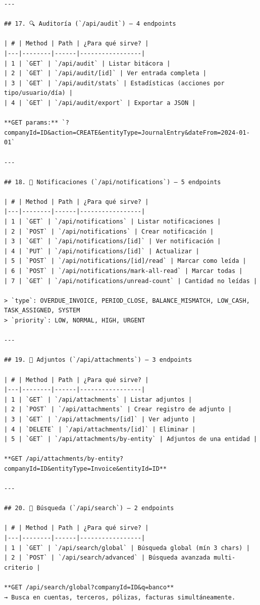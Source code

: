 \documentclass[12pt, a4paper, oneside]{book}
\begin{document}
\begin{lstlisting}
---

## 17. 🔍 Auditoría (`/api/audit`) — 4 endpoints

| # | Method | Path | ¿Para qué sirve? |
|---|--------|------|-----------------|
| 1 | `GET` | `/api/audit` | Listar bitácora |
| 2 | `GET` | `/api/audit/[id]` | Ver entrada completa |
| 3 | `GET` | `/api/audit/stats` | Estadísticas (acciones por tipo/usuario/día) |
| 4 | `GET` | `/api/audit/export` | Exportar a JSON |

**GET params:** `?companyId=ID&action=CREATE&entityType=JournalEntry&dateFrom=2024-01-01`

---

## 18. 🔔 Notificaciones (`/api/notifications`) — 5 endpoints

| # | Method | Path | ¿Para qué sirve? |
|---|--------|------|-----------------|
| 1 | `GET` | `/api/notifications` | Listar notificaciones |
| 2 | `POST` | `/api/notifications` | Crear notificación |
| 3 | `GET` | `/api/notifications/[id]` | Ver notificación |
| 4 | `PUT` | `/api/notifications/[id]` | Actualizar |
| 5 | `POST` | `/api/notifications/[id]/read` | Marcar como leída |
| 6 | `POST` | `/api/notifications/mark-all-read` | Marcar todas |
| 7 | `GET` | `/api/notifications/unread-count` | Cantidad no leídas |

> `type`: OVERDUE_INVOICE, PERIOD_CLOSE, BALANCE_MISMATCH, LOW_CASH, TASK_ASSIGNED, SYSTEM  
> `priority`: LOW, NORMAL, HIGH, URGENT

---

## 19. 📎 Adjuntos (`/api/attachments`) — 3 endpoints

| # | Method | Path | ¿Para qué sirve? |
|---|--------|------|-----------------|
| 1 | `GET` | `/api/attachments` | Listar adjuntos |
| 2 | `POST` | `/api/attachments` | Crear registro de adjunto |
| 3 | `GET` | `/api/attachments/[id]` | Ver adjunto |
| 4 | `DELETE` | `/api/attachments/[id]` | Eliminar |
| 5 | `GET` | `/api/attachments/by-entity` | Adjuntos de una entidad |

**GET /api/attachments/by-entity?companyId=ID&entityType=Invoice&entityId=ID**

---

## 20. 🔎 Búsqueda (`/api/search`) — 2 endpoints

| # | Method | Path | ¿Para qué sirve? |
|---|--------|------|-----------------|
| 1 | `GET` | `/api/search/global` | Búsqueda global (mín 3 chars) |
| 2 | `POST` | `/api/search/advanced` | Búsqueda avanzada multi-criterio |

**GET /api/search/global?companyId=ID&q=banco**
→ Busca en cuentas, terceros, pólizas, facturas simultáneamente.


\end{lstlisting}
\end{document}
